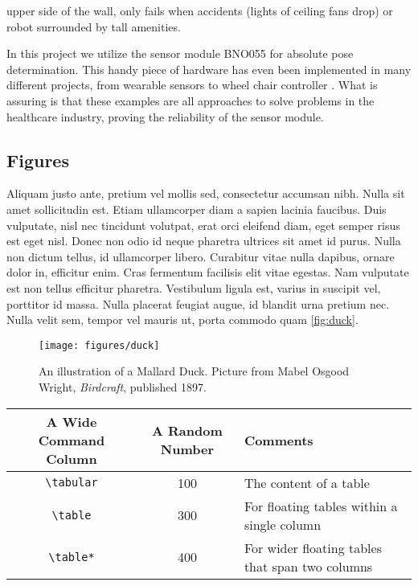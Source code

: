 \documentclass[sigconf, nonacm]{acmart}
\begin{document}
upper side of the wall, only fails when accidents (lights of ceiling fans drop) or robot surrounded by tall amenities. 


In this project we utilize the sensor module BNO055 for absolute pose determination.
This handy piece of hardware has even been implemented in many different projects, from wearable sensors to wheel chair controller \cite{9020328} \cite{8978309} \cite{8648563} \cite{7880342}. 
What is assuring is that these examples are all approaches to solve problems in the healthcare industry, proving the reliability of the sensor module.
\subsection{Figures}

Aliquam justo ante, pretium vel mollis sed, consectetur accumsan nibh. Nulla sit amet sollicitudin est. Etiam ullamcorper diam a sapien lacinia faucibus. Duis vulputate, nisl nec tincidunt volutpat, erat orci eleifend diam, eget semper risus est eget nisl. Donec non odio id neque pharetra ultrices sit amet id purus. Nulla non dictum tellus, id ullamcorper libero. Curabitur vitae nulla dapibus, ornare dolor in, efficitur enim. Cras fermentum facilisis elit vitae egestas. Nam vulputate est non tellus efficitur pharetra. Vestibulum ligula est, varius in suscipit vel, porttitor id massa. Nulla placerat feugiat augue, id blandit urna pretium nec. Nulla velit sem, tempor vel mauris ut, porta commodo quam \autoref{fig:duck}.

\begin{figure}
  \centering
  \texttt{[image: figures/duck]}
  \caption{An illustration of a Mallard Duck. Picture from Mabel Osgood Wright, \textit{Birdcraft}, published 1897.}
  \label{fig:duck}
\end{figure}

\begin{table*}[t]
  \caption{A double column table.}
  \label{tab:commands}
  \begin{tabular}{ccl}
    \toprule
    A Wide Command Column & A Random Number & Comments\\
    \midrule
    \verb|\tabular| & 100& The content of a table \\
    \verb|\table|  & 300 & For floating tables within a single column\\
    \verb|\table*| & 400 & For wider floating tables that span two columns\\
    \bottomrule
  \end{tabular}
\end{table*}
\end{document}
